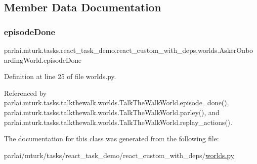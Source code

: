 \subsection{Member Data Documentation}
\mbox{\label{classparlai_1_1mturk_1_1tasks_1_1react__task__demo_1_1react__custom__with__deps_1_1worlds_1_1AskerOnboardingWorld_ad3efea9a7b7fb64de85792f4ec9e91bd}} 
\subsubsection{\texorpdfstring{episode\+Done}{episodeDone}}
{\footnotesize\ttfamily parlai.\+mturk.\+tasks.\+react\+\_\+task\+\_\+demo.\+react\+\_\+custom\+\_\+with\+\_\+deps.\+worlds.\+Asker\+Onboarding\+World.\+episode\+Done}



Definition at line 25 of file worlds.\+py.



Referenced by parlai.\+mturk.\+tasks.\+talkthewalk.\+worlds.\+Talk\+The\+Walk\+World.\+episode\+\_\+done(), parlai.\+mturk.\+tasks.\+talkthewalk.\+worlds.\+Talk\+The\+Walk\+World.\+parley(), and parlai.\+mturk.\+tasks.\+talkthewalk.\+worlds.\+Talk\+The\+Walk\+World.\+replay\+\_\+actions().



The documentation for this class was generated from the following file\+:\begin{DoxyCompactItemize}
\item 
parlai/mturk/tasks/react\+\_\+task\+\_\+demo/react\+\_\+custom\+\_\+with\+\_\+deps/\hyperlink{parlai_2mturk_2tasks_2react__task__demo_2react__custom__with__deps_2worlds_8py}{worlds.\+py}\end{DoxyCompactItemize}
